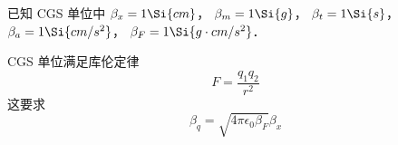 

已知 CGS 单位中 $\beta_x = 1\Si{cm}$， $\beta_m = 1\Si{g}$， $\beta_t = 1\Si{s}$， $\beta_a = 1\Si{cm/s^2}$， $\beta_F = 1\Si{g \cdot cm/s^2}$．

CGS 单位满足库伦定律
\begin{equation}
F = \frac{q_1 q_2}{r^2}
\end{equation}
这要求
\begin{equation}
\beta_q = \sqrt{4\pi\epsilon_0\beta_F} \beta_x
\end{equation}
